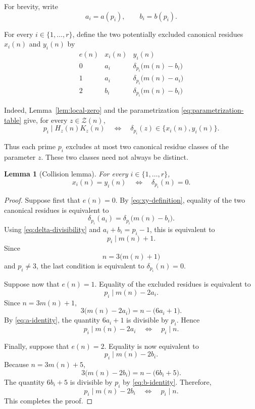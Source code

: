 \documentclass[12pt]{article}
\numberwithin{equation}{section}
\newtheorem{lemma}[theorem]{Lemma}
\theoremstyle{definition}
\theoremstyle{remark}
\newcommand{\Zcal}{\mathcal Z}
\begin{document}
For brevity, write
\[
a_i=a(p_i),
\qquad
b_i=b(p_i).
\]

For every $i\in\{1,\dots,r\}$, define the two potentially
excluded canonical residues $x_i(n)$ and $y_i(n)$ by
\begin{equation}
\label{eq:xy-definition}
\begin{array}{c|c|c}
e(n) & x_i(n) & y_i(n)\\
\hline
0
&
a_i
&
\delta_{p_i}\bigl(m(n)-b_i\bigr)
\\[4pt]
1
&
a_i
&
\delta_{p_i}\bigl(m(n)-a_i\bigr)
\\[4pt]
2
&
b_i
&
\delta_{p_i}\bigl(m(n)-b_i\bigr)
\end{array}
\end{equation}

Indeed, Lemma~\ref{lem:local-zero} and the parametrization
\eqref{eq:parametrization-table} give, for every
$z\in\Zcal(n)$,
\begin{equation}
\label{eq:local-exclusion}
p_i\mid H_z(n)K_z(n)
\quad\Longleftrightarrow\quad
\delta_{p_i}(z)\in\{x_i(n),y_i(n)\}.
\end{equation}

Thus each prime $p_i$ excludes at most two canonical residue
classes of the parameter $z$. These two classes need not always
be distinct.

\begin{lemma}[Collision lemma]
\label{lem:collision}
For every $i\in\{1,\dots,r\}$,
\begin{equation}
\label{eq:collision}
x_i(n)=y_i(n)
\quad\Longleftrightarrow\quad
\delta_{p_i}(n)=0.
\end{equation}
\end{lemma}

\begin{proof}
Suppose first that $e(n)=0$. By
\eqref{eq:xy-definition}, equality of the two canonical residues
is equivalent to
\[
\delta_{p_i}(a_i)
=
\delta_{p_i}\bigl(m(n)-b_i\bigr).
\]
Using \eqref{eq:delta-divisibility} and
$a_i+b_i=p_i-1$, this is equivalent to
\[
p_i\mid m(n)+1.
\]
Since
\[
n=3\bigl(m(n)+1\bigr)
\]
and $p_i\neq3$, the last condition is equivalent to
$\delta_{p_i}(n)=0$.

Suppose now that $e(n)=1$. Equality of the excluded residues is
equivalent to
\[
p_i\mid m(n)-2a_i.
\]
Since $n=3m(n)+1$,
\[
3\bigl(m(n)-2a_i\bigr)
=
n-\bigl(6a_i+1\bigr).
\]
By \eqref{eq:a-identity}, the quantity $6a_i+1$ is divisible by
$p_i$. Hence
\[
p_i\mid m(n)-2a_i
\quad\Longleftrightarrow\quad
p_i\mid n.
\]

Finally, suppose that $e(n)=2$. Equality is now equivalent to
\[
p_i\mid m(n)-2b_i.
\]
Because $n=3m(n)+5$,
\[
3\bigl(m(n)-2b_i\bigr)
=
n-\bigl(6b_i+5\bigr).
\]
The quantity $6b_i+5$ is divisible by $p_i$ by
\eqref{eq:b-identity}. Therefore,
\[
p_i\mid m(n)-2b_i
\quad\Longleftrightarrow\quad
p_i\mid n.
\]
This completes the proof.
\end{proof}
\end{document}
